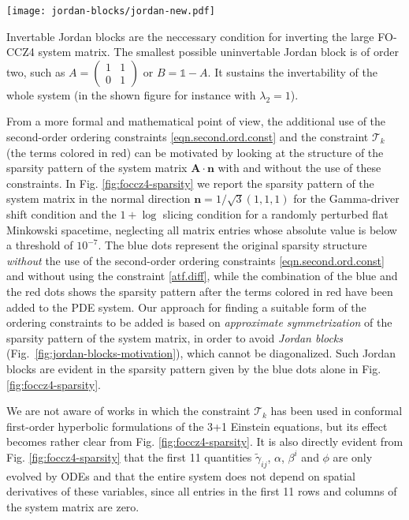\begin{marginfigure}[3cm]
	\texttt{[image: jordan-blocks/jordan-new.pdf]}
	\caption[
	   Jordan blocks cartoon (TikZ matrix), \exclusive
	]{
		Invertable Jordan blocks are the neccessary condition for
		inverting the large FO-CCZ4 system matrix. The smallest
		possible uninvertable Jordan block is of order two,
		such as 
		$A = \begin{pmatrix}1 & 1 \\ 0 & 1 \end{pmatrix}$
		or $B = \mathbb 1 -A$. It sustains the invertability
		of the whole system (in the shown figure for instance
		with $\lambda_2=1$).
	}\label{fig:jordan-blocks-motivation}
\end{marginfigure}
%
From a more formal and mathematical point of view, the additional use of
the second-order ordering constraints \eqref{eqn.second.ord.const} and
the constraint $\mathcal{T}_k$ (the terms colored in red) can be
motivated by looking at the structure of the sparsity pattern of the
system matrix $\boldsymbol{A} \cdot \boldsymbol{n}$ with and without the use
of these constraints. In Fig. \ref{fig:foccz4-sparsity} we report the sparsity
pattern of the system matrix in the normal direction $\boldsymbol{n} =
1/\sqrt{3} (1,1,1)$ for the Gamma-driver shift condition and the $1+\log$
slicing condition for a randomly perturbed flat Minkowski spacetime,
neglecting all matrix entries whose absolute value is below a threshold
of $10^{-7}$. The blue dots represent the original sparsity structure
\textit{without} the use of the second-order ordering constraints
\eqref{eqn.second.ord.const} and without using the constraint
\eqref{atf.diff}, while the combination of the blue and the red dots
shows the sparsity pattern after the terms colored in red have been added
to the PDE system. Our approach for finding a suitable form of the
ordering constraints to be added is based on \textit{approximate
symmetrization} of the sparsity pattern of the system matrix, in order
to avoid \textit{Jordan blocks}
(Fig.~\ref{fig:jordan-blocks-motivation}), which cannot be diagonalized. Such
Jordan blocks are evident in the sparsity pattern given by the blue dots
alone in Fig. \ref{fig:foccz4-sparsity}.

We are not aware of works in which the constraint $\mathcal{T}_k$ has
been used in conformal first-order hyperbolic formulations of the 3+1
Einstein equations, but its effect becomes rather clear from Fig.
\ref{fig:foccz4-sparsity}. It is also directly evident from Fig.
\ref{fig:foccz4-sparsity} that the first 11 quantities $\tilde{\gamma}_{ij}$,
$\alpha$, $\beta^i$ and $\phi$ are only evolved by ODEs and that the
entire system does not depend on spatial derivatives of these variables,
since all entries in the first 11 rows and columns of the system matrix
are zero.

